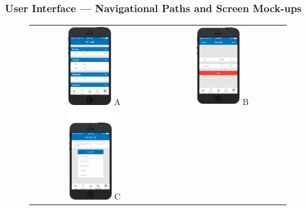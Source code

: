 \documentclass[a4paper, 11pt, titlepage]{article}
\begin{document}
\subsubsection{User Interface --- Navigational Paths and Screen Mock-ups}
\begin{figure}[H]
	\centering
	
	\begin{tabular}{cc}
		\includegraphics[width=0.36\textwidth]{figures/mockups/schedule-1.png} A &
		\includegraphics[width=0.36\textwidth]{figures/mockups/schedule-2.png} B \\
		\includegraphics[width=0.36\textwidth]{figures/mockups/mtds-1.png} C &

\end{tabular}
\end{figure}
\end{document}

